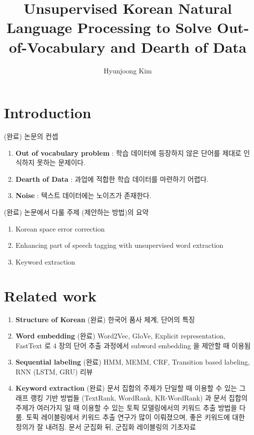 \documentclass[11pt]{article}
\begin{document}
\title{Unsupervised Korean Natural Language Processing to Solve Out-of-Vocabulary and Dearth of Data}
\author{Hyunjoong Kim}

\maketitle
\smallskip


\section{Introduction}

(완료) 논문의 컨셉

\begin{enumerate}[noitemsep]
    \item \textbf{Out of vocabulary problem} : 학습 데이터에 등장하지 않은 단어를 제대로 인식하지 못하는 문제이다.
    \item \textbf{Dearth of Data} : 과업에 적합한 학습 데이터를 마련하기 어렵다.
    \item \textbf{Noise} : 텍스트 데이터에는 노이즈가 존재한다.
\end{enumerate}

(완료) 논문에서 다룰 주제 (제안하는 방법)의 요약

\begin{enumerate}[noitemsep]
    \item Korean space error correction
    \item Enhancing part of speech tagging with unsupervised word extraction
    \item Keyword extraction
\end{enumerate}

\section{Related work}

\begin{enumerate}[noitemsep]
    \item \textbf{Structure of Korean} (완료) 한국어 품사 체계, 단어의 특징
    \item \textbf{Word embedding} (완료) Word2Vec, GloVe, Explicit representation, FastText 로 4 장의 단어 추출 과정에서 subword embedding 을 제안할 때 이용됨
    \item \textbf{Sequential labeling} (완료) HMM, MEMM, CRF, Transition based labeling, RNN (LSTM, GRU) 리뷰
    \item \textbf{Keyword extraction} (완료) 문서 집합의 주제가 단일할 때 이용할 수 있는 그래프 랭킹 기반 방법들 (TextRank, WordRank, KR-WordRank) 과 문서 집합의 주제가 여러가지 일 때 이용할 수 있는 토픽 모델링에서의 키워드 추출 방법을 다룸. 토픽 레이블링에서 키워드 추출 연구가 많이 이뤄졌으며, 좋은 키워드에 대한 정의가 잘 내려짐. 문서 군집화 뒤, 군집화 레이블링의 기초자료
\end{enumerate}
\end{document}
